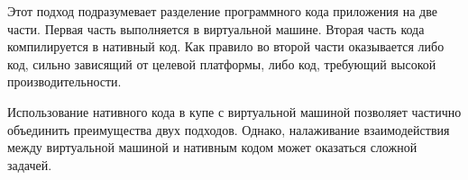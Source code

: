Этот подход подразумевает разделение программного кода приложения на две части. 
Первая часть выполняется в виртуальной машине.
Вторая часть кода компилируется в нативный код. Как правило во второй части оказывается либо код, сильно зависящий от целевой платформы, либо код, требующий высокой производительности.

Использование нативного кода в купе с виртуальной машиной позволяет частично объединить преимущества двух подходов. 
Однако, налаживание взаимодействия между виртуальной машиной и нативным кодом может оказаться сложной задачей.
